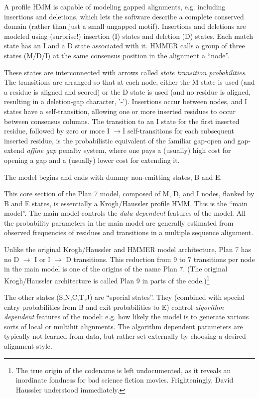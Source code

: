 A profile HMM is capable of modeling gapped alignments, e.g. including
insertions and deletions, which lets the software describe a complete
conserved domain (rather than just a small ungapped motif). Insertions
and deletions are modeled using (surprise!) insertion (I) states and
deletion (D) states. Each match state has an I and a D state
associated with it. HMMER calls a group of three states (M/D/I) at the
same consensus position in the alignment a ``node''.

These states are interconnected with arrows called \emph{state
transition probabilities}. The transitions are arranged so that at
each node, either the M state is used (and a residue is aligned and
scored) or the D state is used (and no residue is aligned, resulting
in a deletion-gap character, '-'). Insertions occur between nodes, and
I states have a self-transition, allowing one or more inserted
residues to occur between consensus columns. The transition to an I
state for the first inserted residue, followed by zero or more I
$\rightarrow$I self-transitions for each subsequent inserted residue,
is the probabilistic equivalent of the familiar gap-open and
gap-extend \emph{affine gap} penalty system, where one pays a
(usually) high cost for opening a gap and a (usually) lower cost for
extending it.

The model begins and ends with dummy non-emitting states, B and E.

This core section of the Plan 7 model, composed of M, D, and I nodes,
flanked by B and E states, is essentially a Krogh/Haussler profile
HMM.  This is the ``main model''. The main model controls the
\textit{data dependent} features of the model. All the probability
parameters in the main model are generally estimated from observed
frequencies of residues and transitions in a multiple sequence
alignment.

Unlike the original Krogh/Haussler and HMMER model architecture, Plan
7 has no D $\rightarrow$ I or I $\rightarrow$ D transitions. This
reduction from 9 to 7 transitions per node in the main model is one of
the origins of the name Plan 7. (The original Krogh/Haussler
architecture is called Plan 9 in parts of the code.)\footnote{The true
origin of the codename is left undocumented, as it reveals an
inordinate fondness for bad science fiction movies. Frighteningly,
David Haussler understood immediately.}

The other states (S,N,C,T,J) are ``special states''. They (combined
with special entry probabilities from B and exit probabilities to E)
control \textit{algorithm dependent} features of the model: e.g. how
likely the model is to generate various sorts of local or multihit
alignments. The algorithm dependent parameters are typically not
learned from data, but rather set externally by choosing a desired
alignment style.

